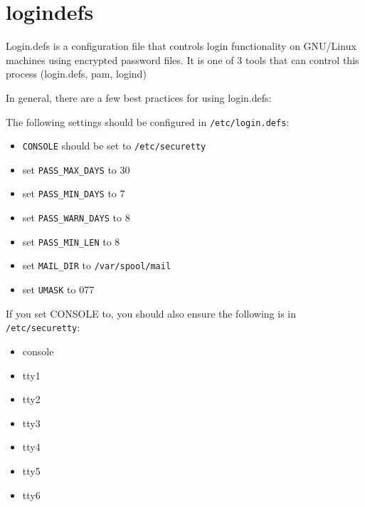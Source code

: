 \section{logindefs}

Login.defs is a configuration file that controls login functionality on GNU/Linux machines using encrypted password files.
It is one of 3 tools that can control this process (login.defs, pam, logind)

In general, there are a few best practices for using login.defs:

The following settings should be configured in \lstinline|/etc/login.defs|:
\begin{itemize}
	\item \lstinline|CONSOLE| should be set to \lstinline|/etc/securetty|
	\item set \lstinline|PASS_MAX_DAYS| to 30
	\item set \lstinline|PASS_MIN_DAYS| to 7
	\item set \lstinline|PASS_WARN_DAYS| to 8
	\item set \lstinline|PASS_MIN_LEN| to 8
	\item set \lstinline|MAIL_DIR| to \lstinline|/var/spool/mail|
	\item set \lstinline|UMASK| to 077
\end{itemize}

If you set CONSOLE to, you should also ensure the following is in \lstinline|/etc/securetty|:
\begin{itemize}
	\item console
	\item tty1
	\item tty2
	\item tty3
	\item tty4
	\item tty5
	\item tty6
\end{itemize}

